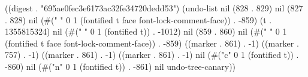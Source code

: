 
((digest . "695ae0fec3e6173ac32fe34720dedd53") (undo-list nil (828 . 829) nil (827 . 828) nil (#("
" 0 1 (fontified t face font-lock-comment-face)) . -859) (t . 1355815324) nil (#("
" 0 1 (fontified t)) . -1012) nil (859 . 860) nil (#("
" 0 1 (fontified t face font-lock-comment-face)) . -859) ((marker . 861) . -1) ((marker . 757) . -1) ((marker . 861) . -1) ((marker . 861) . -1) nil (#("c" 0 1 (fontified t)) . -860) nil (#("n" 0 1 (fontified t)) . -861) nil undo-tree-canary))
